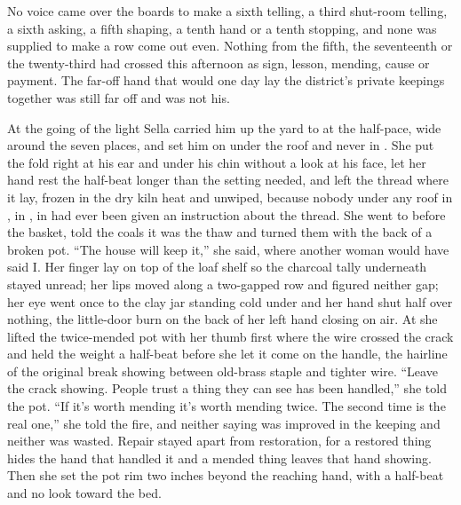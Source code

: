 No voice came over the boards to make a sixth telling, a third shut-room telling, a sixth asking, a fifth shaping, a tenth hand or a tenth stopping, and none was supplied to make a row come out even. Nothing from the fifth, the seventeenth or the twenty-third had crossed this afternoon as sign, lesson, mending, cause or payment. The far-off hand that would one day lay the district's private keepings together was still far off and was not his.

\scenebreak

At the going of the light Sella carried him up the yard to  at the half-pace, wide around the seven places, and set him on  under the roof and never in . She put the fold right at his ear and under his chin without a look at his face, let her hand rest the half-beat longer than the setting needed, and left the thread where it lay, frozen in the dry kiln heat and unwiped, because nobody under any roof in , in , in  had ever been given an instruction about the thread. She went to  before the basket, told the coals it was the thaw and turned them with the back of a broken pot. “The house will keep it,” she said, where another woman would have said I. Her finger lay on top of the loaf shelf so the charcoal tally underneath stayed unread; her lips moved along a two-gapped row and figured neither gap; her eye went once to the clay jar standing cold under  and her hand shut half over nothing, the little-door burn on the back of her left hand closing on air. At  she lifted the twice-mended pot with her thumb first where the wire crossed the crack and held the weight a half-beat before she let it come on the handle, the hairline of the original break showing between old-brass staple and tighter wire. “Leave the crack showing. People trust a thing they can see has been handled,” she told the pot. “If it's worth mending it's worth mending twice. The second time is the real one,” she told the fire, and neither saying was improved in the keeping and neither was wasted. Repair stayed apart from restoration, for a restored thing hides the hand that handled it and a mended thing leaves that hand showing. Then she set the pot rim two inches beyond the reaching hand, with a half-beat and no look toward the bed.

